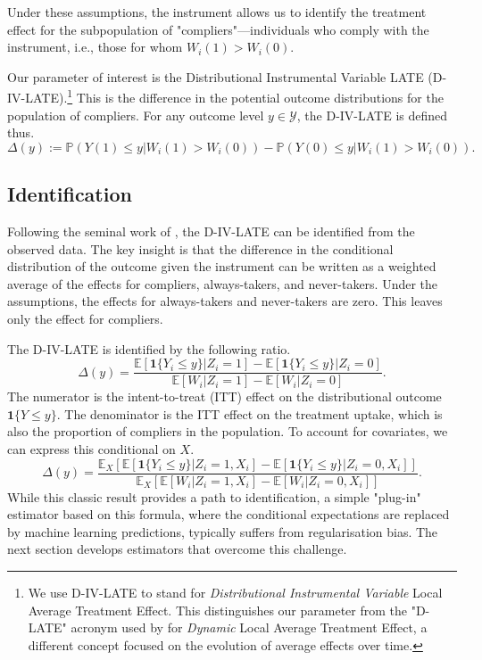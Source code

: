 \documentclass[final,3p,fleqn, 10pt]{elsarticle}
\begin{document}
Under these assumptions, the instrument allows us to identify the treatment effect for the subpopulation of "compliers"—individuals who comply with the instrument, i.e., those for whom $W_i(1) > W_i(0)$.

Our parameter of interest is the Distributional Instrumental Variable LATE (D-IV-LATE).\footnote{We use D-IV-LATE to stand for \textit{Distributional Instrumental Variable} Local Average Treatment Effect. This distinguishes our parameter from the "D-LATE" acronym used by \citet{hoagland2020who} for \textit{Dynamic} Local Average Treatment Effect, a different concept focused on the evolution of average effects over time.} This is the difference in the potential outcome distributions for the population of compliers. For any outcome level $y \in \mathcal{Y}$, the D-IV-LATE is defined thus.
\begin{equation} \label{eq:dlate_def}
\Delta(y) := \mathbb{P}(Y(1) \le y | W_i(1) > W_i(0)) - \mathbb{P}(Y(0) \le y | W_i(1) > W_i(0)).
\end{equation}

\subsection{Identification}

Following the seminal work of \citet{imbens1994}, the D-IV-LATE can be identified from the observed data. The key insight is that the difference in the conditional distribution of the outcome given the instrument can be written as a weighted average of the effects for compliers, always-takers, and never-takers. Under the assumptions, the effects for always-takers and never-takers are zero. This leaves only the effect for compliers.

The D-IV-LATE is identified by the following ratio.
\begin{equation} \label{eq:dlate_identification}
\Delta(y) = \frac{\mathbb{E}[\mathbf{1}\{Y_i \le y\} | Z_i=1] - \mathbb{E}[\mathbf{1}\{Y_i \le y\} | Z_i=0]}{\mathbb{E}[W_i | Z_i=1] - \mathbb{E}[W_i | Z_i=0]}.
\end{equation}
The numerator is the intent-to-treat (ITT) effect on the distributional outcome $\mathbf{1}\{Y \le y\}$. The denominator is the ITT effect on the treatment uptake, which is also the proportion of compliers in the population. To account for covariates, we can express this conditional on $X$.
\begin{equation} \label{eq:dlate_identification_cov_merged}
\Delta(y) = \frac{\mathbb{E}_{X}[\mathbb{E}[\mathbf{1}\{Y_i \le y\} | Z_i=1, X_i] - \mathbb{E}[\mathbf{1}\{Y_i \le y\} | Z_i=0, X_i]]}{\mathbb{E}_{X}[\mathbb{E}[W_i | Z_i=1, X_i] - \mathbb{E}[W_i | Z_i=0, X_i]]}.
\end{equation}
While this classic result provides a path to identification, a simple "plug-in" estimator based on this formula, where the conditional expectations are replaced by machine learning predictions, typically suffers from regularisation bias. The next section develops estimators that overcome this challenge.
\end{document}
